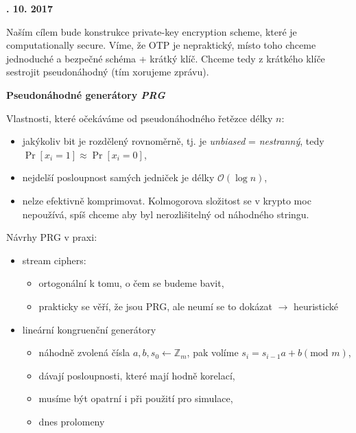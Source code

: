 \documentclass[a4paper,12pt,titlepage]{article}
\def\podnadpis#1{{\bigskip\bf\noindent#1\medskip\par}}
\begin{document}
\podnadpis{19. 10. 2017}

Naším cílem bude konstrukce private-key encryption scheme, které je computationally secure.
Víme, že OTP je nepraktický, místo toho chceme jednoduché a bezpečné schéma + krátký klíč.
Chceme tedy z krátkého klíče sestrojit pseudonáhodný  (tím xorujeme zprávu).

\podnadpis{Pseudonáhodné generátory \emph{PRG}}

Vlastnosti, které očekáváme od pseudonáhodného řetězce délky $n$:
\begin{itemize}
	\item  jakýkoliv bit je rozdělený rovnoměrně, tj. je \emph{unbiased} = \emph{nestranný}, tedy $\Pr[x_i = 1] \approx \Pr[x_i = 0]$,
	\item  nejdelší posloupnost samých jedniček je délky $\mathcal{O}(\log n)$,
	\item  nelze efektivně komprimovat.
		Kolmogorova složitost se v krypto moc nepoužívá, spíš chceme aby byl nerozlišitelný od náhodného stringu.
\end{itemize}

Návrhy PRG v praxi:
\begin{itemize}
	\item  stream ciphers:
		\begin{itemize}
			\item  ortogonální k tomu, o čem se budeme bavit,
			\item  prakticky se věří, že jsou PRG, ale neumí se to dokázat $\rightarrow$ heuristické
		\end{itemize}

	\item  lineární kongruenční generátory
		\begin{itemize}
			\item  náhodně zvolená čísla $a, b, s_0 \leftarrow \mathbb{Z}_m$, pak volíme $s_i = s_{i - 1} a + b (\text{mod } m)$,
			\item  dávají posloupnosti, které mají hodně korelací,
			\item  musíme být opatrní i při použití pro simulace,
			\item  dnes prolomeny
		\end{itemize}
\end{itemize}
\end{document}
